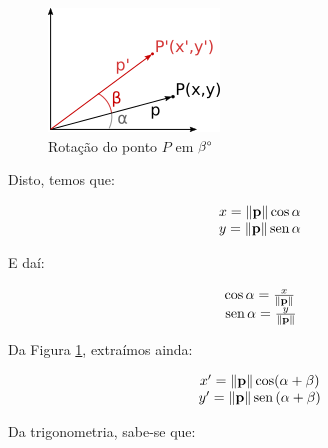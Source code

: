\documentclass[a4paper,11pt,pagenumber=true]{article}
\newcommand{\vecnorm}[1]{\|\mathbf{#1}\|}
\renewcommand{\sin}{\text{\,sen\,}}
\theoremstyle{mytheor}
\begin{document}
            \begin{figure}[h]
                \centering
                \includegraphics{images/Q-2-A.png}
                    \caption{Rotação do ponto $P$ em $\beta\degree$}
                    \label{fig:q2a}
            \end{figure}

            Disto, temos que:
            
            \begin{equation*}
                \begin{matrix}
                    x = \vecnorm{p}\cos\alpha \\
                    y = \vecnorm{p}\sin\alpha \\
                \end{matrix}
            \end{equation*}
            
            E daí: 
            
            \begin{equation}
                \begin{matrix}
                    \cos\alpha = \frac{x}{\vecnorm{p}} \\
                    \sin\alpha = \frac{y}{\vecnorm{p}} \\
                \end{matrix}
                \label{eq:p}
            \end{equation}

            Da Figura \ref{fig:q2a}, extraímos ainda:
            
            \begin{equation}
                \begin{matrix}
                    x' = \vecnorm{p}\cos(\alpha+\beta) \\
                    y' = \vecnorm{p}\sin(\alpha+\beta) \\
                \end{matrix}
                \label{eq:pr}
            \end{equation}

            Da trigonometria, sabe-se que:
            
\end{document}
